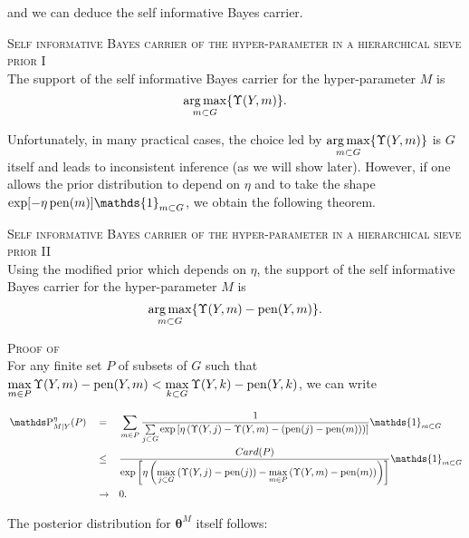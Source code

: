 and we can deduce the self informative Bayes carrier.

\begin{lm}{\textsc{Self informative Bayes carrier of the hyper-parameter in a hierarchical sieve prior I}\\}\label{lm2.2.1}
The support of the self informative Bayes carrier for the hyper-parameter $M$ is
\[\operatorname*{arg\,max}\limits_{m \subset G} \{\Upsilon(Y, m)\}.\]
\end{lm}

Unfortunately, in many practical cases, the choice led by $\operatorname*{arg\,max}\limits_{m \subset G} \{\Upsilon(Y, m)\}$ is $G$ itself and leads to inconsistent inference (as we will show later).
However, if one allows the prior distribution to depend on $\eta$ and to take the shape $\exp[- \eta \pen(m)] \mathds{1}_{m \subset G}$, we obtain the following theorem.

\begin{thm}{\textsc{Self informative Bayes carrier of the hyper-parameter in a hierarchical sieve prior II}\\}\label{thm2.2.1}
Using the modified prior which depends on $\eta$, the support of the self informative Bayes carrier for the hyper-parameter $M$ is
\[\operatorname*{arg\,max}\limits_{m \subset G} \{\Upsilon(Y, m) - \operatorname{pen}(Y, m)\}.\]
\end{thm}

\begin{pro}{\textsc{Proof of }\\}\label{pro2.2.1}
For any finite set $P$ of subsets of $G$ such that $\max\limits_{m \in P} \Upsilon(Y, m) - \operatorname{pen}(Y, m) < \max\limits_{k \subset G} \Upsilon(Y, k) - \operatorname{pen}(Y, k)$, we can write

\begin{alignat*}{3}
& \P_{M\vert Y}^{\eta}(P) && = && \sum\limits_{m \in P} \frac{1}{\sum\limits_{j \subset G}\exp\left[\eta \left(\Upsilon(Y, j) - \Upsilon(Y, m) - \left(\pen(j) - \pen(m)\right)\right)\right]} \mathds{1}_{m \subset G}\\
& && \leq && \frac{Card(P)}{\exp\left[\eta \left(\max\limits_{j \subset G}\left(\Upsilon(Y, j) - \pen(j)\right) - \max\limits_{m \in P}\left(\Upsilon(Y, m) - \pen(m)\right)\right)\right]} \mathds{1}_{m \subset G}\\
& && \rightarrow && 0.
\end{alignat*}
\qedsymbol
\end{pro}


The posterior distribution for $\boldsymbol{\theta}^{M}$ itself follows:

